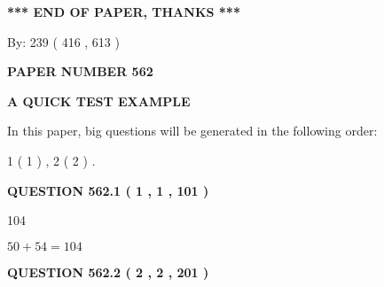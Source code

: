 \documentclass[12pt]{article}
\begin{document}
   
   
   
   
\vspace{1.0in} 
{\textbf{\large{ *** END OF PAPER, THANKS *** }}} 
   
   
\hspace{1.0in} By: 
 239 ( 416 ,  613 )
   
   
   
   
\newpage 
\setcounter{page}{ 
   562001 } 
   
   
   
   
 {\textbf{ \Large{ PAPER NUMBER  562  }}}
   
   
\vspace{0.2in}
   
   
   
   
   
   
 \vspace{0.2in}
{\LARGE {\textbf{ A QUICK TEST EXAMPLE}}}
   
   
   
\vspace{0.2in}
   
In this paper, big questions will be generated in the following order: 
   
   
   1 ( 1 )
 ,
   2 ( 2 )
 .
  
\vspace{0.2in}
  
{\textbf{\Large{QUESTION
562.1 
 ( 1 , 1 , 101 )
}}}
  
  
 
 
\noindent{}

104
 
 
 
 
\noindent{}

$ %
50 +  %
54=   %
104$
 
 
  
\vspace{0.2in}
  
{\textbf{\Large{QUESTION
562.2 
 ( 2 , 2 , 201 )
}}}
  
  
 
 
\noindent{}
 
\end{document}
